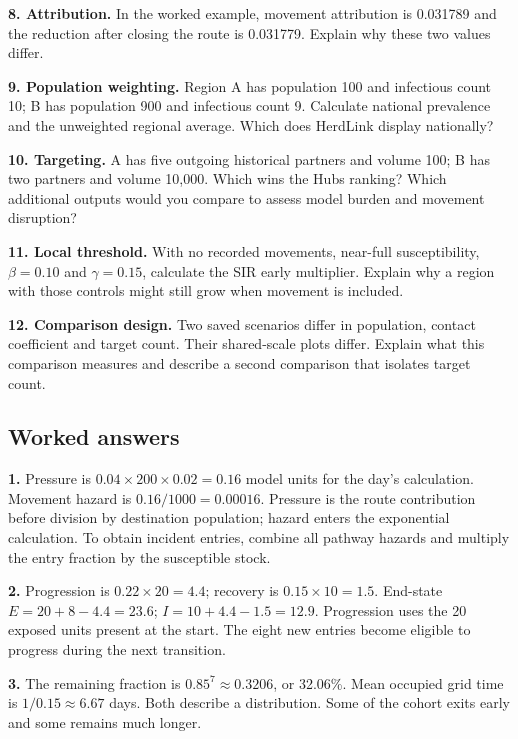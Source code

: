 \documentclass[11pt,a4paper]{article}
\begin{document}
\textbf{8. Attribution.} In the worked example, movement attribution is
0.031789 and the reduction after closing the route is 0.031779. Explain
why these two values differ.

\textbf{9. Population weighting.} Region A has population 100 and
infectious count 10; B has population 900 and infectious count 9.
Calculate national prevalence and the unweighted regional average. Which
does HerdLink display nationally?

\textbf{10. Targeting.} A has five outgoing historical partners and
volume 100; B has two partners and volume 10,000. Which wins the Hubs
ranking? Which additional outputs would you compare to assess model
burden and movement disruption?

\textbf{11. Local threshold.} With no recorded movements, near-full
susceptibility, \(\beta  = 0.10\) and \(\gamma  = 0.15\), calculate the
SIR early multiplier. Explain why a region with those controls might
still grow when movement is included.

\textbf{12. Comparison design.} Two saved scenarios differ in
population, contact coefficient and target count. Their shared-scale
plots differ. Explain what this comparison measures and describe a
second comparison that isolates target count.

\subsection{Worked answers}\label{worked-answers}

\textbf{1.} Pressure is \(0.04 \times  200 \times  0.02 = 0.16\) model
units for the day's calculation. Movement hazard is
\(0.16/1000 = 0.00016\). Pressure is the route contribution before
division by destination population; hazard enters the exponential
calculation. To obtain incident entries, combine all pathway hazards and
multiply the entry fraction by the susceptible stock.

\textbf{2.} Progression is \(0.22 \times  20 = 4.4\); recovery is
\(0.15 \times  10 = 1.5\). End-state \(E = 20 + 8 - 4.4 = 23.6\);
\(I = 10 + 4.4 - 1.5 = 12.9\). Progression uses the 20 exposed units
present at the start. The eight new entries become eligible to progress
during the next transition.

\textbf{3.} The remaining fraction is \(0.85^7 \approx  0.3206\), or
32.06\%. Mean occupied grid time is \(1/0.15 \approx  6.67\) days. Both
describe a distribution. Some of the cohort exits early and some remains
much longer.
\end{document}
